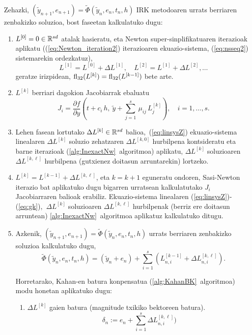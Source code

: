 Zehazki, $(\tilde{y}_{n+1}, e_{n+1})=\tilde{\Phi}(\tilde{y}_n, e_n, t_n, h)$  IRK metodoaren urrats berriaren zenbakizko soluzioa, bost faseetan kalkulatuko dugu:
 \begin{enumerate}
\item
$L^{[0]}=0 \in \mathbb{R}^{sd}$ atalak hasieratu, eta Newton super-sinplifikatuaren iterazioak aplikatu ((\ref{eq:Newton_iteration2}) iterazioaren ekuazio-sistema, (\ref{eq:nsseq2}) sistemarekin ordezkatuz), 
\[
L^{[1]}=L^{[0]} +\Delta L^{[1]}, \quad  L^{[2]}=L^{[1]} +\Delta L^{[2]} , \ldots
\]
geratze irizpidean, $ \mathrm{fl}_{32}(L^{[k]}) = \mathrm{fl}_{32}(L^{[k-1]})$ bete arte.

\item
$L^{[k]}$ berriari dagokion Jacobiarrak ebaluatu 
\begin{equation*}
J_i= \frac{\partial f}{\partial y}\left(t +c_i\,  h,  \ \tilde y+  \sum_{j=1}^{s}\, \mu_{ij}\, L_{j}^{[k]}\right), \quad i=1,\ldots,s.
\end{equation*}
%
\item
Lehen fasean lortutako $\Delta L^{[k]} \in \mathbb{R}^{sd}$ balioa,~(\ref{eq:linsysZ}) ekuazio-sistema linealaren $\Delta L^{[k]}$ soluzio zehatzaren $\Delta L^{[k,0]}$ hurbilpena kontsideratu eta 
barne iterazioak  (\ref{alg:InexactNw}~algoritmoa) aplikatu, $\Delta L^{[k]}$ soluzioaren $\Delta L^{[k,\ell]}$ hurbilpena (gutxienez doitasun arruntarekin) lortzeko.

\item 
$L^{[k]} = L^{[k-1]} + \Delta L^{[k,\ell]}$, eta $k=k+1$ eguneratu ondoren, Sasi-Newton iterazio bat aplikatuko dugu bigarren urratsean kalkulatutako $J_i$ Jacobiarraren balioak erabiliz. Ekuazio-sistema linealaren (\ref{eq:linsysZ})-(\ref{eq:gk}), $ \ \Delta L^{[k]}$ soluzioaren  $\Delta L^{[k,\ell]}$ hurbilpenak (berriz ere doitasun arruntean)  \ref{alg:InexactNw}~algoritmoa aplikatuz kalkulatuko ditugu.

\item 
Azkenik, $(\tilde{y}_{n+1}, e_{n+1})=\tilde \Phi(\tilde{y}_n, e_n, t_n, h)$  urrats berriaren zenbakizko soluzioa kalkulatuko dugu,
\begin{equation*}
\tilde \Phi(\tilde{y}_n, e_n, t_n, h)=(\tilde y_n + e_n) + \sum_{i=1}^{s}(L_{n,i}^{[k-1]} + \Delta L_{n,i}^{[k,\ell]}).
\end{equation*}

Horretarako, Kahan-en batura konpensatua (\ref{alg:KahanBK}~algoritmoa) modu honetan aplikatuko dugu:
\begin{enumerate}
\item $\Delta L^{[k]}$ gaien batura (magnitude txikiko bektoreen batura).
\begin{equation*}
\delta_n :=  e_n + \sum_{i=1}^{s} \Delta L_{n,i}^{[k,\ell]})
\end{equation*}


\end{enumerate}
\end{enumerate}
